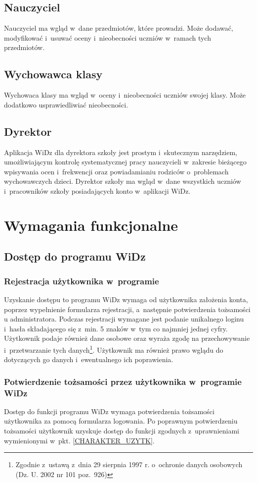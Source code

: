 \documentclass[12pt,leqno,twoside]{mwart}
\begin{document}
\subsection{Nauczyciel}
\noindent Nauczyciel ma wgląd w~dane przedmiotów, które prowadzi. Może dodawać, modyfikować i~usuwać oceny i~nieobecności uczniów w~ramach tych przedmiotów.

\subsection{Wychowawca klasy}
\noindent Wychowaca klasy ma wgląd w~oceny i~nieobecności uczniów swojej klasy. Może dodatkowo usprawiedliwiać nieobecności.

\subsection{Dyrektor}
\noindent Aplikacja WiDz dla dyrektora szkoły jest prostym i~skutecznym narzędziem, umożliwiającym kontrolę systematycznej pracy nauczycieli w~zakresie bieżącego wpisywania ocen i~frekwencji oraz powiadamianiu rodziców o~problemach wychowawczych dzieci. Dyrektor szkoły ma wgląd w~dane wszystkich uczniów i~pracowników szkoły posiadających konto w~aplikacji WiDz.

\section{Wymagania funkcjonalne}
\subsection{Dostęp do programu WiDz}
\subsubsection{Rejestracja użytkownika w~programie}
\noindent Uzyskanie dostępu to programu WiDz wymaga od użytkownika założenia konta, poprzez wypełnienie formularza rejestracji, a~następnie potwierdzenia tożsamości u administratora. Podczas rejestracji wymagane jest podanie unikalnego loginu i~hasła składającego się z~min. 5 znaków w~tym co najmniej jednej cyfry. Użytkownik podaje również dane osobowe oraz wyraża zgodę na przechowywanie i~przetwarzanie tych danych\footnote{Zgodnie z~ustawą z~dnia 29 sierpnia 1997 r. o~ochronie danych osobowych (Dz. U. 2002 nr 101 poz.~926)}. Użytkownik ma również prawo wglądu do dotyczących go danych i~ewentualnego ich poprawienia.

\subsubsection{Potwierdzenie tożsamości przez użytkownika w~programie WiDz}
\noindent Dostęp do funkcji programu WiDz wymaga potwierdzenia tożsamości użytkownika za pomocą formularza logowania. Po poprawnym potwierdzeniu tożsamości użytkownik uzyskuje dostęp do funkcji zgodnych z~uprawnieniami wymienionymi w~pkt. \ref{CHARAKTER_UZYTK}. 
\end{document}
